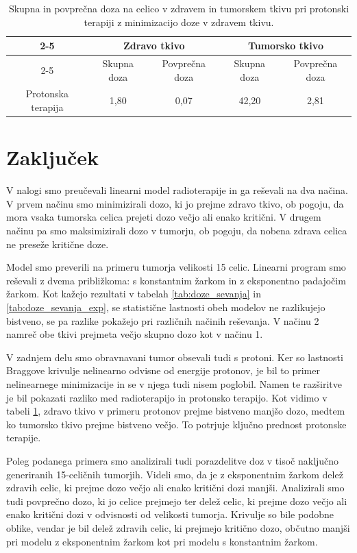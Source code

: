 \documentclass[slovene,11pt,a4paper]{article}
\begin{document}
\begin{table}[h!]
\centering
\begin{tabular}{c|c|c||c|c|}
\cline{2-5}		
		& \multicolumn{2}{c||}{Zdravo tkivo} & \multicolumn{2}{c|}{Tumorsko tkivo} \\
\cline{2-5}
		& Skupna doza & Povprečna doza & Skupna doza & Povprečna doza \\
\hline
Protonska terapija	& 1,80 & 0,07 & 42,20 & 2,81 \\
\hline
\end{tabular}
\caption{Skupna in povprečna doza na celico v zdravem in tumorskem tkivu pri protonski terapiji z minimizacijo doze v zdravem tkivu.}
\label{tab:doze_sevanja_proton}
\end{table}

\section{Zaključek}

V nalogi smo preučevali linearni model radioterapije in ga reševali na dva načina. V prvem načinu smo minimizirali dozo, ki jo prejme zdravo tkivo, ob pogoju, da mora vsaka tumorska celica prejeti dozo večjo ali enako kritični. V drugem načinu pa smo maksimizirali dozo v tumorju, ob pogoju, da nobena zdrava celica ne preseže kritične doze.

Model smo preverili na primeru tumorja velikosti 15 celic. Linearni program smo reševali z dvema približkoma: s konstantnim žarkom in z eksponentno padajočim žarkom. Kot kažejo rezultati v tabelah \ref{tab:doze_sevanja} in \ref{tab:doze_sevanja_exp}, se statistične lastnosti obeh modelov ne razlikujejo bistveno, se pa razlike pokažejo pri različnih načinih reševanja. V načinu 2 namreč obe tkivi prejmeta večjo skupno dozo kot v načinu 1.

V zadnjem delu smo obravnavani tumor obsevali tudi s protoni. Ker so lastnosti Braggove krivulje nelinearno odvisne od energije protonov, je bil to primer nelinearnege minimizacije in se v njega tudi nisem poglobil. Namen te razširitve je bil pokazati razliko med radioterapijo in protonsko terapijo. Kot vidimo v tabeli \ref{tab:doze_sevanja_proton}, zdravo tkivo v primeru protonov prejme bistveno manjšo dozo, medtem ko tumorsko tkivo prejme bistveno večjo. To potrjuje ključno prednost protonske terapije.

Poleg podanega primera smo analizirali tudi porazdelitve doz v tisoč naključno generiranih 15-celičnih tumorjih. Videli smo, da je z eksponentnim žarkom delež zdravih celic, ki prejme dozo večjo ali enako kritični dozi manjši. Analizirali smo tudi povprečno dozo, ki jo celice prejmejo ter delež celic, ki prejme dozo večjo ali enako kritični dozi v odvisnosti od velikosti tumorja. Krivulje so bile podobne oblike, vendar je bil delež zdravih celic, ki prejmejo kritično dozo, občutno manjši pri modelu z eksponentnim žarkom kot pri modelu s konstantnim žarkom.
\end{document}

